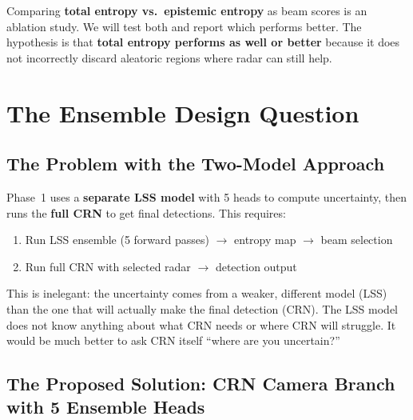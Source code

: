 \documentclass[12pt, a4paper]{article}
\theoremstyle{definition}
\begin{document}
\begin{ablationbox}
Comparing \textbf{total entropy vs.\ epistemic entropy} as beam scores is an
ablation study. We will test both and report which performs better.
The hypothesis is that \textbf{total entropy performs as well or better} because
it does not incorrectly discard aleatoric regions where radar can still help.
\end{ablationbox}

\section{The Ensemble Design Question}
\label{sec:ensemble_design}

\subsection{The Problem with the Two-Model Approach}

Phase~1 uses a \textbf{separate LSS model} with 5 heads to compute uncertainty,
then runs the \textbf{full CRN} to get final detections. This requires:
\begin{enumerate}
  \item Run LSS ensemble (5 forward passes) $\to$ entropy map $\to$ beam selection
  \item Run full CRN with selected radar $\to$ detection output
\end{enumerate}

\begin{plainbox}
This is inelegant: the uncertainty comes from a weaker, different model (LSS)
than the one that will actually make the final detection (CRN). The LSS model
does not know anything about what CRN needs or where CRN will struggle.
It would be much better to ask CRN itself ``where are you uncertain?''
\end{plainbox}

\subsection{The Proposed Solution: CRN Camera Branch with 5 Ensemble Heads}
\label{sec:ensemble_heads}
\end{document}
